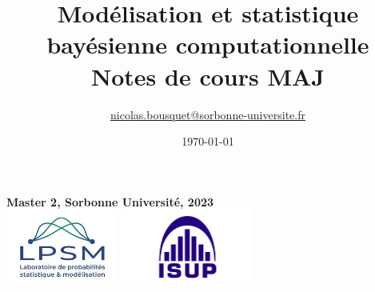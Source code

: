 \documentclass[10pt]{article}
\title{{\bf Modélisation et statistique bayésienne computationnelle} \\ \vspace{1cm} Notes de cours MAJ}
\date{\today}
\author{\url{nicolas.bousquet@sorbonne-universite.fr}}
\begin{document}
\maketitle
\vspace{0.5cm} 
\begin{center}
\vspace{2cm} 
  {\large {\bf Master 2,  Sorbonne Universit\'e, 2023}} \\
  \vspace{1cm}
  \includegraphics[height=25mm]{logos/lpsm.jpg}
  \includegraphics[height=25mm]{logos/isup.jpg}
  \end{center}
 




\newpage

\tableofcontents

\newpage

%
% 
%
\def\mycmdexo{0}  %
\def\mycmdexotwo{0} %
\def\mycmdexothree{0} %
\def\mycmdproof{0} %
\def\mycmdprooftwo{0} %
\def\mycmdproofthree{0} %
\def\mycmdtpone{0} %
\def\mycmdtpthree{0} %
\def\mycmdannalesenonce{0} %
\def\mycmdannales{0} %







\end{document}
